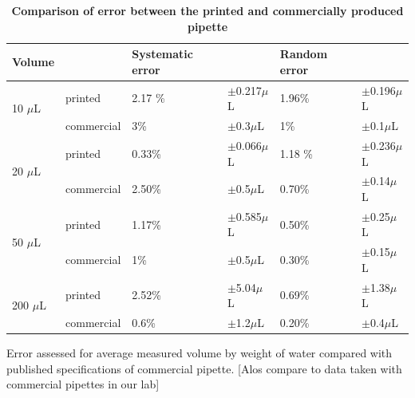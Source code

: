 \documentclass[10pt,letterpaper]{article}
\begin{document}
\begin{table}[]
\centering
\caption{
\bf{Comparison of error between the printed and commercially produced pipette}}
\begin{tabular}{llllll}
                  Volume &   & Systematic error &  & Random error & \\
                  \hline
\multirow{2}{*}{10 $\mu$L} & printed & 2.17 \% & $\pm$0.217$\mu$L  & 1.96\% & $\pm$0.196$\mu$L   \\
                  & commercial & 3\% & $\pm$0.3$\mu$L  & 1\% & $\pm$0.1$\mu$L  \\
                  \hline
\multirow{2}{*}{20 $\mu$L} & printed  & 0.33\% & $\pm$0.066$\mu$L & 1.18 \% & $\pm$0.236$\mu$L \\
                  & commercial & 2.50\% & $\pm$0.5$\mu$L & 0.70\% & $\pm$0.14$\mu$L \\
                  \hline
\multirow{2}{*}{50 $\mu$L} & printed & 1.17\% & $\pm$0.585$\mu$L & 0.50\% & $\pm$0.25$\mu$L \\
                  & commercial & 1\% & $\pm$0.5$\mu$L & 0.30\% & $\pm$0.15$\mu$L \\
                  \hline
\multirow{2}{*}{200 $\mu$L} & printed & 2.52\% & $\pm$5.04$\mu$L & 0.69\% & $\pm$1.38$\mu$L  \\
                  & commercial & 0.6\% & $\pm$1.2$\mu$L & 0.20\% & $\pm$0.4$\mu$L
\end{tabular}
\begin{flushleft} Error assessed for average measured volume by weight of water compared with published specifications of commercial pipette. [Alos compare to data taken with commercial pipettes in our lab]
\end{flushleft}
\label{table0}
\end{table}
\end{document}
